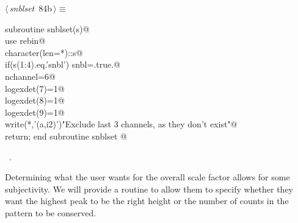 \documentclass[10pt,a4paper,notitlepage]{article}
\begin{document}
\begin{flushleft} \small
\begin{minipage}{\linewidth}\label{scrap104}\raggedright\small
{} $\langle\,${\it snblset}\nobreak\ {\footnotesize {84b}}$\,\rangle\equiv$
\vspace{-1ex}
\begin{list}{}{} \item
\mbox{}\verb@      subroutine snblset(s)@\\
\mbox{}\verb@      use rebin@\\
\mbox{}\verb@      character(len=*)::s@\\
\mbox{}\verb@      if(s(1:4).eq.'snbl') snbl=.true.@\\
\mbox{}\verb@      nchannel=6@\\
\mbox{}\verb@      logexdet(7)=1@\\
\mbox{}\verb@      logexdet(8)=1@\\
\mbox{}\verb@      logexdet(9)=1@\\
\mbox{}\verb@      write(*,'(a,i2)')"Exclude last 3 channels, as they don't exist"@\\
\mbox{}\verb@      return; end subroutine snblset                                      @{\NWsep}
\end{list}
\vspace{-1.5ex}
\footnotesize
\begin{list}{}{\setlength{\itemsep}{-\parsep}\setlength{\itemindent}{-\leftmargin}}
\item \NWtxtMacroRefIn\ .

\item{}
\end{list}
\end{minipage}\vspace{4ex}
\end{flushleft}
Determining what the user wants for the overall scale factor allows for 
some subjectivity.
We will provide a routine to allow them to specify whether they
want the highest peak to be the right height or the number of
counts in the pattern to be conserved.
\end{document}
